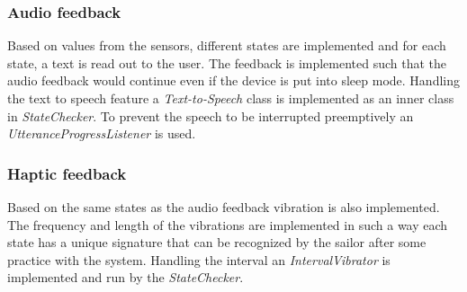\subsubsection{Audio feedback}
Based on values from the sensors, different states are implemented and for each state, a text is read out to the user. The feedback is implemented such that the audio feedback would continue even if the device is put into sleep mode. Handling the text to speech feature a \emph{Text-to-Speech}\cite{texttospeech} class is implemented as an inner class in \emph{StateChecker}. To prevent the speech to be interrupted preemptively an \emph{UtteranceProgressListener}\cite{utter} is used. 

\subsubsection{Haptic feedback}
Based on the same states as the audio feedback vibration is also implemented. The frequency and length of the vibrations are implemented in such a way each state has a unique signature that can be recognized by the sailor after some practice with the system. Handling the interval an \emph{IntervalVibrator} is implemented and run by the \emph{StateChecker}.

